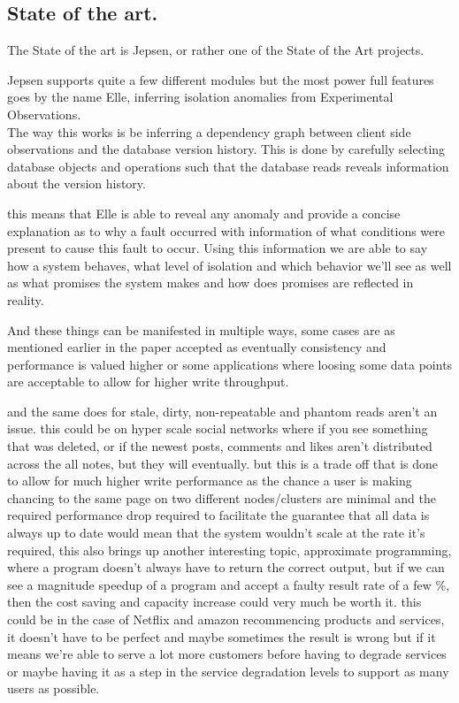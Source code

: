 \documentclass[a4paper,10pt,titlepage]{report}
\begin{document}
\subsection{State of the art.}

The State of the art is Jepsen, or rather one of the State of the Art projects.

Jepsen supports quite a few different modules but the most power full features goes by the name Elle, inferring isolation anomalies from Experimental Observations. \\

The way this works is be inferring a dependency graph between client side observations and the database version history. This is done by carefully selecting database objects and operations such that the database reads reveals information about the version history.

this means that Elle is able to reveal any anomaly and provide a concise explanation as to why a fault occurred with information of what conditions were present to cause this fault to occur. Using this information we are able to say how a system behaves, what level of isolation and which behavior we'll see as well as what promises the system makes and how does promises are reflected in reality.

And these things can be manifested in multiple ways, some cases are as mentioned earlier in the paper accepted as eventually consistency and performance is valued higher or some applications where loosing some data points are acceptable to allow for higher write throughput.

and the same does for stale, dirty, non-repeatable and phantom reads aren't an issue. this could be on hyper scale social networks where if you see something that was deleted, or if the newest posts, comments and likes aren't distributed across the all notes, but they will eventually. but this is a trade off that is done to allow for much higher write performance as the chance a user is making chancing to the same page on two different nodes/clusters are minimal and the required performance drop required to facilitate the guarantee that all data is always up to date would mean that the system wouldn't scale at the rate it's required, this also brings up another interesting topic, approximate programming, where a program doesn't always have to return the correct output, but if we can see a magnitude speedup of a program and accept a faulty result rate of a few \%, then the cost saving and capacity increase could very much be worth it. this could be in the case of Netflix and amazon recommencing products and services, it doesn't have to be perfect and maybe sometimes the result is wrong but if it means we're able to serve a lot more customers before having to degrade services or maybe having it as a step in the service degradation levels to support as many users as possible. \\
\end{document}
